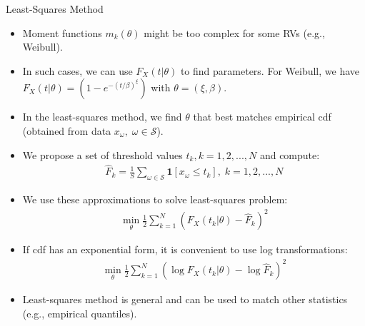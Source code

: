 \documentclass[9pt]{beamer}
\begin{document}
%
\begin{frame}{Least-Squares Method}

\begin{itemize}

\item Moment functions $m_k(\theta)$ might be too complex for some RVs (e.g., Weibull).

\item In such cases, we can use $F_X(t|\theta)$ to find parameters. For Weibull, we have $F_X(t|\theta)=(1-e^{-(t/\beta)^\xi})$ with $\theta=(\xi,\beta)$. 

\item In the least-squares method, we find $\theta$ that best matches empirical cdf (obtained from data $x_\omega,\; \omega \in \mathcal{S}$). 

\item We propose a set of threshold values $t_k, k=1,2,...,N$ and compute:
\begin{align*}
\hat{F}_k=\frac{1}{S}\sum_{\omega \in \mathcal{S}}\mathbf{1}[x_\omega\leq t_k],\; k=1,2,...,N
\end{align*}

\item  We use these approximations to solve least-squares problem:
\begin{align*}
\min_\theta \frac{1}{2}\sum_{k=1}^N(F_X(t_k|\theta)-\hat{F}_k)^2
\end{align*}
\item If cdf has an exponential form, it is convenient to use log transformations:
 \begin{align*}
\min_\theta \frac{1}{2}\sum_{k=1}^N(\log F_X(t_k|\theta)-\log \hat{F}_k)^2
\end{align*}
\item Least-squares method is general and can be used to match other statistics (e.g., empirical quantiles).

\end{itemize}

\end{frame}
\end{document}
